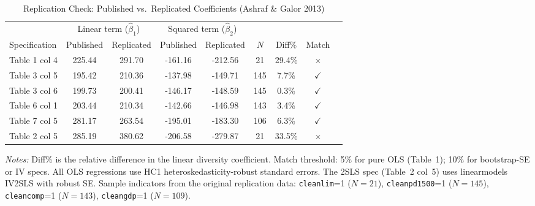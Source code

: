 \begin{table}[htbp]
\centering
\caption{Replication Check: Published vs.\ Replicated Coefficients (Ashraf \& Galor 2013)}
\label{tab:replication}
\small
\begin{tabular}{lcccccccc}
\toprule
 & \multicolumn{2}{c}{Linear term ($\hat\beta_1$)} & \multicolumn{2}{c}{Squared term ($\hat\beta_2$)} & & & \\
\cmidrule(lr){2-3}\cmidrule(lr){4-5}
Specification & Published & Replicated & Published & Replicated & $N$ & Diff\% & Match \\
\midrule
Table 1 col 4 & 225.44 & 291.70 & -161.16 & -212.56 & 21 & 29.4\% & $\times$ \\
Table 3 col 5 & 195.42 & 210.36 & -137.98 & -149.71 & 145 & 7.7\% & $\checkmark$ \\
Table 3 col 6 & 199.73 & 200.41 & -146.17 & -148.59 & 145 & 0.3\% & $\checkmark$ \\
Table 6 col 1 & 203.44 & 210.34 & -142.66 & -146.98 & 143 & 3.4\% & $\checkmark$ \\
Table 7 col 5 & 281.17 & 263.54 & -195.01 & -183.30 & 106 & 6.3\% & $\checkmark$ \\
Table 2 col 5 & 285.19 & 380.62 & -206.58 & -279.87 & 21 & 33.5\% & $\times$ \\
\bottomrule
\end{tabular}
\begin{minipage}{\linewidth}
\vspace{2pt}
\footnotesize
\textit{Notes:} Diff\% is the relative difference in the linear diversity coefficient.
Match threshold: 5\% for pure OLS (Table~1); 10\% for bootstrap-SE or IV specs.
All OLS regressions use HC1 heteroskedasticity-robust standard errors.
The 2SLS spec (Table~2 col~5) uses linearmodels IV2SLS with robust SE.
Sample indicators from the original replication data: \texttt{cleanlim}=1 ($N=21$),
\texttt{cleanpd1500}=1 ($N=145$), \texttt{cleancomp}=1 ($N=143$), \texttt{cleangdp}=1 ($N=109$).
\end{minipage}
\end{table}
